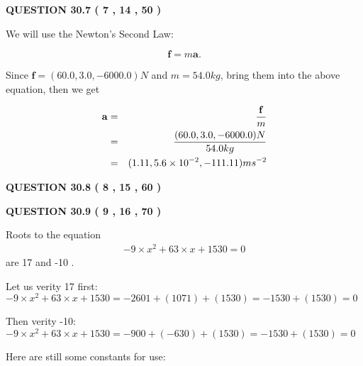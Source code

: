 \documentclass[12pt]{article}
\begin{document}
 
 
  
\vspace{0.2in}
  
{\textbf{\Large{QUESTION
30.7 
 (           7 ,          14 ,          50 )
}}}
  
  
 
 

We will use the Newton's Second Law:
 
\[
\mathbf{f}=m\mathbf{a}.
\]
 
Since $\mathbf{f}= %
(60.0 , 3.0 , -6000.0) N$
and $m= %
54.0kg$, bring them into the above equation, then we get
 
\begin{eqnarray*}
\mathbf{a}&=&\frac{\mathbf{f}}m  \\
&=&\frac{ %
(60.0 , 3.0 , -6000.0) N}{ %
54.0kg}  \\
&=& %
(1.11 , 5.6 \times 10^{-2} , -111.11) ms^{-2}
\end{eqnarray*}
 
 
 
  
\vspace{0.2in}
  
{\textbf{\Large{QUESTION
30.8 
 (           8 ,          15 ,          60 )
}}}
  
  
 
 

 
 
  
\vspace{0.2in}
  
{\textbf{\Large{QUESTION
30.9 
 (           9 ,          16 ,          70 )
}}}
  
  


 
 

Roots to the equation
\begin{eqnarray*}
-9 \times x^2  %
+  %
63
                 \times x    %
+  %
1530 =0
\end{eqnarray*}
are  %
17 and  %
-10 .
 
Let us verity  %
17 first:
$  %
-9 \times x^2  %
+  %
63
                 \times x    %
+  %
1530
  = %
-2601+( %
1071)+( %
1530)
  = %
-1530+( %
1530)
  = %
0
$
 
Then verity  %
-10:
$  %
-9 \times x^2  %
+  %
63
                 \times x    %
+  %
1530
  = %
-900+( %
-630)+( %
1530)
  = %
-1530+( %
1530)
  = %
0
$
 
 
 
   
   
 \vspace{0.2in}
Here are still some constants for use:
 
\end{document}

